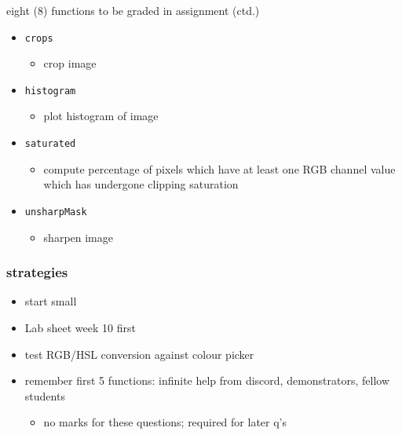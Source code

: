 \documentclass[english,14pt]{beamer}
\begin{document}
\begin{frame}[fragile]

\frametitle{}

eight (8) functions to be graded in assignment (ctd.)

\begin{itemize}
	\item \texttt{crops}
	\begin{itemize}
		\item crop image
	\end{itemize}
		
	\item \texttt{histogram}
	\begin{itemize}
		\item plot histogram of image
	\end{itemize}
			
	\item \texttt{saturated}
	\begin{itemize}
		\item compute percentage of pixels which have at least one RGB channel value which has undergone clipping saturation
	\end{itemize}
			
	\item \texttt{unsharpMask}
	\begin{itemize}
		\item sharpen image
	\end{itemize}
\end{itemize}

\end{frame}


\begin{frame}[fragile]

\frametitle{strategies}

\begin{itemize}
	\item start small
	\item Lab sheet week 10 first
	\item test RGB/HSL conversion against colour picker
	\item remember first 5 functions: infinite help from discord, demonstrators, fellow students
	\begin{itemize}
		\item no marks for these questions; required for later q's
	\end{itemize}

\end{itemize}

\end{frame}
\end{document}
